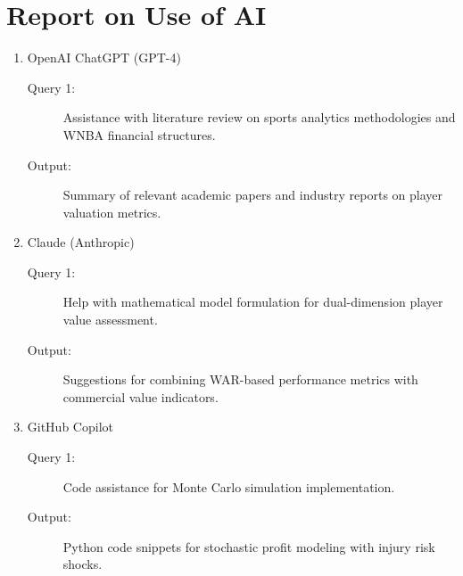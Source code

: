\documentclass{mcmthesis}
\begin{document}
\section*{Report on Use of AI}

\begin{enumerate}
\item OpenAI ChatGPT (GPT-4)
\begin{description}
\item[Query 1:] Assistance with literature review on sports analytics methodologies and WNBA financial structures.
\item[Output:] Summary of relevant academic papers and industry reports on player valuation metrics.
\end{description}

\item Claude (Anthropic)
\begin{description}
\item[Query 1:] Help with mathematical model formulation for dual-dimension player value assessment.
\item[Output:] Suggestions for combining WAR-based performance metrics with commercial value indicators.
\end{description}

\item GitHub Copilot
\begin{description}
\item[Query 1:] Code assistance for Monte Carlo simulation implementation.
\item[Output:] Python code snippets for stochastic profit modeling with injury risk shocks.
\end{description}
\end{enumerate}

\clearpage
\setcounter{page}{\value{lastpage}}
\end{document}
